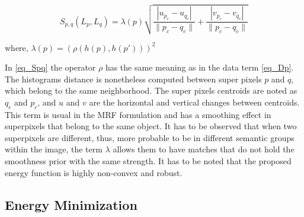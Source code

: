 \begin{equation}
S_{p,q}(L_p,L_q) = \lambda(p)
  \sqrt{\frac{|u_{p_c}-u_{q_c}|}{\|p_c-q_c\|}+ \frac{|v_{p_c}-v_{q_c}|}{\|p_c-q_c\|}}
\label{eq_Spq}
\end{equation}
\begin{center}
 where, $ \lambda(p) = (\rho(h(p),h(p')))^2 $ \\
\end{center}

In \ref{eq_Spq} the operator $\rho$ has the same meaning as in the
data term \ref{eq_Dp}. The histograms distance is nonetheless
computed between super pixels $p$ and $q$, which belong to
the same neighborhood. The super pixels
centroids are noted as $q_c$ and $p_c$, and $u$ and $v$ are the
horizontal and vertical changes between centroids.
This term is usual in the MRF formulation and has a
smoothing effect in superpixels that belong to the
same object. It has to be observed that when two
superpixels are different, thus, more probable to be
in different semantic groups within the image, the
term $\lambda$ allows them to have
matches that do not hold the smoothness prior with the same strength. 
It has to be noted that the proposed energy function is
highly non-convex and robust.

\subsection{Energy Minimization}

